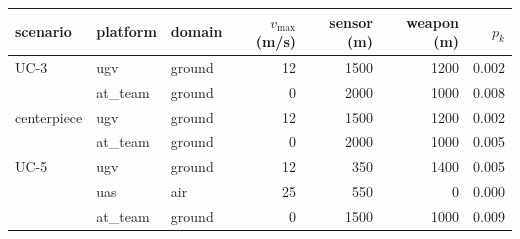 \begin{tabular}{lllrrrr}
\toprule
scenario & platform & domain & $v_{\max}$ (m/s) & sensor (m) & weapon (m) & $p_k$ \\
\midrule
UC-3 & ugv & ground & 12 & 1500 & 1200 & 0.002 \\
 & at\_team & ground & 0 & 2000 & 1000 & 0.008 \\
centerpiece & ugv & ground & 12 & 1500 & 1200 & 0.002 \\
 & at\_team & ground & 0 & 2000 & 1000 & 0.005 \\
UC-5 & ugv & ground & 12 & 350 & 1400 & 0.005 \\
 & uas & air & 25 & 550 & 0 & 0.000 \\
 & at\_team & ground & 0 & 1500 & 1000 & 0.009 \\
\bottomrule
\end{tabular}
